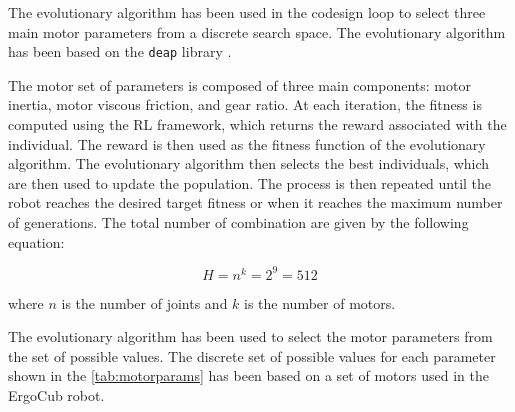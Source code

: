 The evolutionary algorithm has been used in the codesign loop to select three main motor parameters from a discrete search space. The evolutionary algorithm has been based on the \texttt{deap} library \citep{DEAP_JMLR2012}.

The motor set of parameters is composed of three main components: motor inertia, motor viscous friction, and gear ratio. At each iteration, the fitness is computed using the \ac{RL} framework, which returns the reward associated with the individual. The reward is then used as the fitness function of the evolutionary algorithm. The evolutionary algorithm then selects the best individuals, which are then used to update the population. The process is then repeated until the robot reaches the desired target fitness or when it reaches the maximum number of generations. The total number of combination are given by the following equation:

\begin{equation}
    H = n^k = 2^9 = 512
\end{equation}

where $n$ is the number of joints and $k$ is the number of motors.

The evolutionary algorithm has been used to select the motor parameters from the set of possible values. The discrete set of possible values for each parameter shown in the \cref{tab:motorparams} has been based on a set of motors used in the ErgoCub robot.

